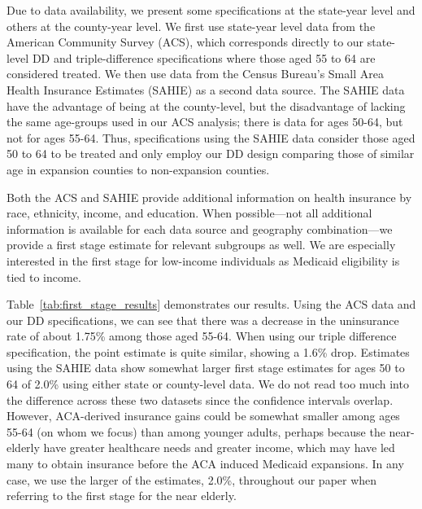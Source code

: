 \documentclass[12pt]{article}%
\begin{document}
    Due to data availability, we present some specifications at the state-year level and others at the county-year level. 
    We first use state-year level data from the American Community Survey (ACS), which corresponds directly to our state-level DD and triple-difference specifications where those aged 55 to 64 are considered treated. 
    We then use data from the Census Bureau’s Small Area Health Insurance Estimates (SAHIE) as a second data source. 
    The SAHIE data have the advantage of being at the county-level, but the disadvantage of lacking the same age-groups used in our ACS analysis; there is data for ages 50-64, but not for ages 55-64. 
    Thus, specifications using the SAHIE data consider those aged 50 to 64 to be treated and only employ our DD design comparing those of similar age in expansion counties to non-expansion counties.

  Both the ACS and SAHIE provide additional information on health insurance by race, ethnicity, income, and education. 
  When possible---not all additional information is available for each data source and geography combination---we provide a first stage estimate for relevant subgroups as well. 
  We are especially interested in the first stage for low-income individuals as Medicaid eligibility is tied to income.

    Table~\ref{tab:first_stage_results} demonstrates our results. 
    Using the ACS data and our DD specifications, we can see that there was a decrease in the uninsurance rate of about 1.75\% among those aged 55-64. 
    When using our triple difference specification, the point estimate is quite similar, showing a 1.6\% drop. 
    Estimates using the SAHIE data show somewhat larger first stage estimates for ages 50 to 64 of 2.0\%  using either state or county-level data. 
    We do not read too much into the difference across these two datasets since the confidence intervals overlap. 
    However, ACA-derived insurance gains could be somewhat smaller among ages 55-64 (on whom we focus) than among younger adults, perhaps because the near-elderly have greater healthcare needs and greater income, which may have led many to obtain insurance before the ACA induced Medicaid expansions. 
    In any case, we use the larger of the estimates, 2.0\%, throughout our paper when referring to the first stage for the near elderly.
\end{document}
